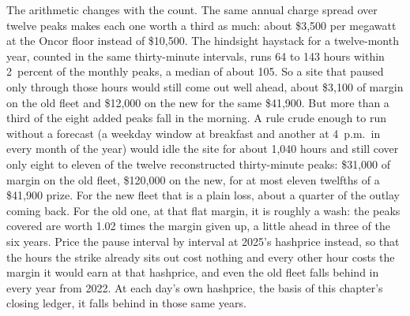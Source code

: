The arithmetic changes with the count. The same annual charge spread over twelve peaks makes each one worth a third as much: about \$3,500 per megawatt at the Oncor floor instead of \$10,500. %
The hindsight haystack for a twelve-month year, counted in the same thirty-minute intervals, runs 64 to 143 hours within 2~percent of the monthly peaks, a median of about 105. So a site that paused only through those hours would still come out well ahead, about \$3,100 of margin on the old fleet and \$12,000 on the new for the same \$41,900. %
But more than a third of the eight added peaks fall in the morning. A rule crude enough to run without a forecast (a weekday window at breakfast and another at 4~p.m.\ in every month of the year) would idle the site for about 1,040 hours and still cover only eight to eleven of the twelve reconstructed thirty-minute peaks: \$31,000 of margin on the old fleet, \$120,000 on the new, for at most eleven twelfths of a \$41,900 prize. %
For the new fleet that is a plain loss, about a quarter of the outlay coming back. For the old one, at that flat margin, it is roughly a wash: the peaks covered are worth 1.02 times the margin given up, a little ahead in three of the six years. Price the pause interval by interval at 2025's hashprice instead, so that the hours the strike already sits out cost nothing and every other hour costs the margin it would earn at that hashprice, and even the old fleet falls behind in every year from 2022. At each day's own hashprice, the basis of this chapter's closing ledger, it falls behind in those same years. %
